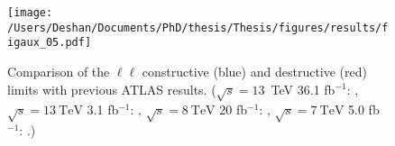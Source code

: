 \begin{figure}[!htpb]
    \centering
    \texttt{[image: /Users/Deshan/Documents/PhD/thesis/Thesis/figures/results/figaux\_05.pdf]}
    \caption[Comparison of the $\ell\ell$ constructive (blue) and destructive (red) limits with previous ATLAS results.]{Comparison of the $\ell\ell$ constructive (blue) and destructive (red) limits with previous ATLAS results. ($\sqrt{s}=13$~TeV 36.1 fb$^{-1}$: \cite{EXOT-2016-05}, $\sqrt{s}=\SI{13}{\tera\electronvolt}$ 3.1 fb$^{-1}$: \cite{EXOT-2015-07}, $\sqrt{s}=\SI{8}{\tera\electronvolt}$ 20 fb$^{-1}$: \cite{EXOT-2013-19}, $\sqrt{s}=\SI{7}{\tera\electronvolt}$ 5.0 fb$^{-1}$: \cite{EXOT-2012-17}.)}
    \label{fig:limit_evol}
\end{figure}